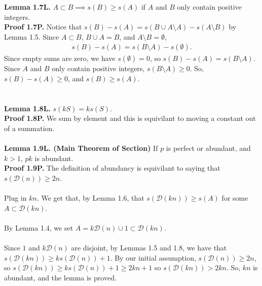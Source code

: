 \documentclass{article}
\begin{document}
\textbf{Lemma 1.7L. }$A \subset B \implies s(B) \ge s(A)$ if $A$ and $B$ only contain positive integers. \\
\textbf{Proof 1.7P. }Notice that $s(B) - s(A) = s(B \cup A \setminus A) - s(A \setminus B)$ by Lemma 1.5. \newline
Since $A \subset B$, $B \cup A = B$, and $A \setminus B = \emptyset$, 
\begin{align*}
    s(B) - s(A) = s(B \setminus A) - s(\emptyset).
\end{align*} 
Since empty sums are zero, we have $s(\emptyset) = 0$,
so $s(B) - s(A) = s(B \setminus A)$. Since $A$ and $B$ only contain positive integers, $s(B \setminus A) \ge 0$. So, $s(B) - s(A) \ge 0$, and
$s(B) \ge s(A)$. \\~\\~\\
\textbf{Lemma 1.8L. }$s(kS) = ks(S)$. \\
\textbf{Proof 1.8P. }We sum by element and this is equivilant to moving a constant out of a summation. \\~\\
\textbf{Lemma 1.9L. (Main Theorem of Section)} If $p$ is perfect or abundant, and $k > 1$, $pk$ is abundant. \\
\textbf{Proof 1.9P. }The definition of abundancy is equivilant to saying that $s(\mathcal{D}(n)) \ge 2n$. \\~\\

Plug in $kn$. We get that, by Lemma 1.6, that $s(\mathcal{D}(kn)) \ge s(A)$ for some $A \subset \mathcal{D}(kn)$. \\~\\
By Lemma 1.4, we set $A = k\mathcal{D}(n) \cup 1 \subset \mathcal{D}(kn)$. \\~\\
Since $1$ and $k\mathcal{D}(n)$ are disjoint, by Lemmas 1.5 and 1.8, we have that $s(\mathcal{D}(kn)) \ge ks(\mathcal{D}(n)) + 1$. By our initial 
assumption, $s(\mathcal{D}(n)) \ge 2n$, so $s(\mathcal{D}(kn)) \ge ks(\mathcal{D}(n)) + 1 \ge 2kn + 1$ so $s(\mathcal{D}(kn)) > 2kn$. So, $kn$ is abundant,
and the lemma is proved.
\newpage 
\end{document}
